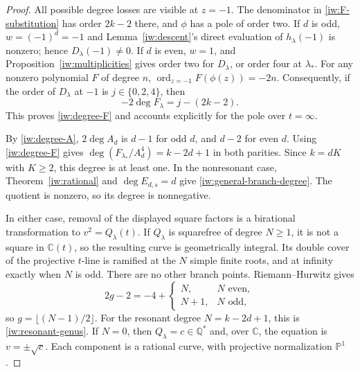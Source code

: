 \documentclass[11pt,a4paper]{article}
\theoremstyle{definition}
\theoremstyle{remark}
\begin{document}
\begin{proof}
All possible degree losses are visible at \(z=-1\).
The denominator in \eqref{iw:F-substitution} has order \(2k-2\)
there, and \(\phi\) has a pole of order two.
If \(d\) is odd, \(w=(-1)^d=-1\) and
Lemma~\ref{iw:descent}'s direct evaluation of \(h_\lambda(-1)\)
is nonzero; hence \(D_\lambda(-1)\ne0\).
If \(d\) is even, \(w=1\), and
Proposition~\ref{iw:multiplicities} gives order two for
\(D_\lambda\), or order four at \(\lambda_*\).
For any nonzero polynomial \(F\) of degree \(n\),
\(\operatorname{ord}_{z=-1}F(\phi(z))=-2n\).
Consequently, if the order of \(D_\lambda\) at \(-1\) is
\(j\in\{0,2,4\}\), then
\[
 -2\deg F_\lambda=j-(2k-2).
 \tag{\(\diamond\)}
\]
This proves \eqref{iw:degree-F} and accounts explicitly for
the pole over \(t=\infty\).

By \eqref{iw:degree-A}, \(2\deg A_d\) is \(d-1\) for odd \(d\),
and \(d-2\) for even \(d\). Using \eqref{iw:degree-F} gives
\(\deg(F_{\lambda_*}/A_d^4)=k-2d+1\) in both parities.
Since \(k=dK\) with \(K\ge2\), this degree is at least one.
In the nonresonant case, Theorem~\ref{iw:rational} and
\(\deg E_{d,s}=d\) give \eqref{iw:general-branch-degree}.
The quotient is nonzero, so its degree is nonnegative.

In either case, removal of the displayed square factors is
a birational transformation to \(v^2=Q_\lambda(t)\).
If \(Q_\lambda\) is squarefree of degree \(N\ge1\), it is not
a square in \(\mathbb C(t)\), so the resulting curve is
geometrically integral. Its double cover of the projective
\(t\)-line is ramified at the \(N\) simple finite roots, and
at infinity exactly when \(N\) is odd. There are no other
branch points. Riemann--Hurwitz \cite[Tag~0C1B]{Stacks} gives
\[
 2g-2=-4+
 \begin{cases}
 N,&N\text{ even},\\
 N+1,&N\text{ odd},
 \end{cases}
\]
so \(g=\lfloor(N-1)/2\rfloor\).
For the resonant degree \(N=k-2d+1\), this is
\eqref{iw:resonant-genus}.
If \(N=0\), then \(Q_\lambda=c\in\mathbb Q^*\) and, over
\(\mathbb C\), the equation is \(v=\pm\sqrt c\).
Each component is a rational curve, with projective
normalization \(\mathbb P^1\).
\end{proof}
\end{document}
